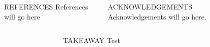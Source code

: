 \documentclass[final,t]{beamer}
\begin{document}
\begin{frame}{}
\begin{columns}[t]
\begin{column}{.3\linewidth}
        \begin{columns}
        \begin{column}{.02\linewidth} \end{column}
            \begin{column}{.48\linewidth}
                \begin{block}{\uppercase{References}}
                    References will go here
                \end{block}
            \end{column}
            \begin{column}{.48\linewidth}
                \begin{block}{\uppercase{Acknowledgements}}
                    Acknowledgements will go here.
                \end{block}
            \end{column}
        \end{columns}

    \end{column}
  \end{columns}
  \begin{columns}
      \begin{column}{.02\linewidth} \end{column}
      \begin{column}{.9625\linewidth}
          \begin{block}{TAKEAWAY}
              Test
          \end{block}
      \end{column}
      \begin{column}{.0175\linewidth} \end{column}
  \end{columns}
\end{frame}
\end{document}
